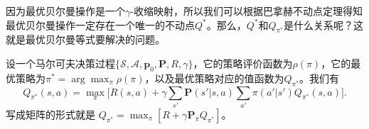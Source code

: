 因为最优贝尔曼操作是一个$\gamma$-收缩映射，所以我们可以根据巴拿赫不动点定理得知最优贝尔曼操作一定存在一个唯一的不动点$Q^*$。那么，$Q^*$和$Q_{\pi^*}$是什么关系呢？这就是最优贝尔曼等式要解决的问题。
\begin{theorem}\label{thm:optimal-bellman-equation}
    设一个马尔可夫决策过程$\{\mathcal{S}, \mathcal{A}, \mathbf{p}_0, \mathbf{P}, R, \gamma\}$，它的策略评价函数为$\rho(\pi)$，它的最优策略为$\pi^* = \arg\max_{\pi} \rho(\pi)$，以及最优策略对应的值函数为$Q_{\pi^*}$。我们有
    \begin{equation}
        Q_{\pi^*}(s, a) = \max_{\pi} \bigg[R(s, a) + \gamma \sum_{s'} \mathbf{P}(s' \vert s, a)
        \sum_{a'} \pi(a' \vert s') Q_{\pi^*}(s, a)\bigg].
    \end{equation}
    写成矩阵的形式就是 $Q_{\pi^*} = \max_{\pi} [R + \gamma \mathbf{P}_{\pi} Q_{\pi^*}]$。
\end{theorem}
